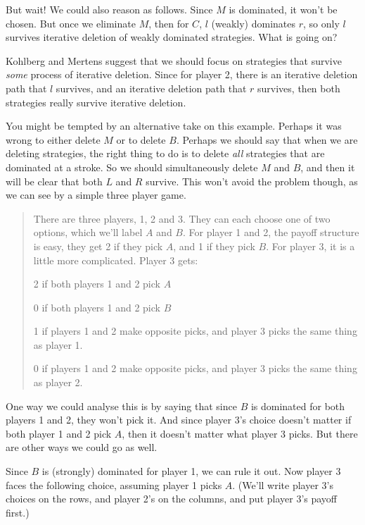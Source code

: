 But wait! We could also reason as follows. Since $M$ is dominated, it won't be chosen. But once we eliminate $M$, then for $C$, $l$ (weakly) dominates $r$, so only $l$ survives iterative deletion of weakly dominated strategies. What is going on?

Kohlberg and Mertens suggest that we should focus on strategies that survive \textit{some} process of iterative deletion. Since for player 2, there is an iterative deletion path that $l$ survives, and an iterative deletion path that $r$ survives, then both strategies really survive iterative deletion. 

You might be tempted by an alternative take on this example. Perhaps it was wrong to either delete $M$ or to delete $B$. Perhaps we should say that when we are deleting strategies, the right thing to do is to delete \textit{all} strategies that are dominated at a stroke. So we should simultaneously delete $M$ and $B$, and then it will be clear that both $L$ and $R$ survive. This won't avoid the problem though, as we can see by a simple three player game.

\begin{quote}

There are three players, 1, 2 and 3. They can each choose one of two options, which we'll label $A$ and $B$. For player 1 and 2, the payoff structure is easy, they get 2 if they pick $A$, and 1 if they pick $B$. For player 3, it is a little more complicated. Player 3 gets:
\begin{itemize*}
\item 2 if both players 1 and 2 pick $A$
\item 0 if both players 1 and 2 pick $B$
\item 1 if players 1 and 2 make opposite picks, and player 3 picks the same thing as player 1.
\item 0 if players 1 and 2 make opposite picks, and player 3 picks the same thing as player 2.
\end{itemize*}
\end{quote}

\noindent One way we could analyse this is by saying that since $B$ is dominated for both players 1 and 2, they won't pick it. And since player 3's choice doesn't matter if both player 1 and 2 pick $A$, then it doesn't matter what player 3 picks. But there are other ways we could go as well.

Since $B$ is (strongly) dominated for player 1, we can rule it out. Now player 3 faces the following choice, assuming player 1 picks $A$. (We'll write player 3's choices on the rows, and player 2's on the columns, and put player 3's payoff first.)

